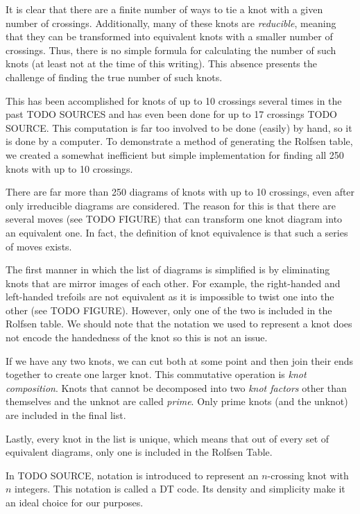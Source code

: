 \begin{paper}

It is clear that there are a finite number of ways to tie a knot with a given
number of crossings.
Additionally, many of these knots are \textit{reducible}, meaning that they can
be transformed into equivalent knots with a smaller number of crossings.
Thus, there is no simple formula for calculating the number of such knots (at
least not at the time of this writing).
This absence presents the challenge of finding the true number of such knots.

This has been accomplished for knots of up to 10 crossings several times in the
past TODO SOURCES and has even been done for up to 17 crossings TODO
SOURCE.
This computation is far too involved to be done (easily) by hand, so it is done
by a computer.
To demonstrate a method of generating the Rolfsen table, we created a somewhat
inefficient but simple implementation for finding all 250 knots with up to 10
crossings.

There are far more than 250 diagrams of knots with up to 10 crossings, even
after only irreducible diagrams are considered.
The reason for this is that there are several moves (see TODO FIGURE) that can
transform one knot diagram into an equivalent one.
In fact, the definition of knot equivalence is that such a series of moves
exists.

The first manner in which the list of diagrams is simplified is by eliminating
knots that are mirror images of each other.
For example, the right-handed and left-handed trefoils are not equivalent as it
is impossible to twist one into the other (see TODO FIGURE).
However, only one of the two is included in the Rolfsen table.
We should note that the notation we used to represent a knot does not
encode the handedness of the knot so this is not an issue.

If we have any two knots, we can cut both at some point and then join their ends
together to create one larger knot.
This commutative operation is \textit{knot composition}.
Knots that cannot be decomposed into two \textit{knot factors} other than
themselves and the unknot are called \textit{prime}.
Only prime knots (and the unknot) are included in the final list.

Lastly, every knot in the list is unique, which means that out of every set of
equivalent diagrams, only one is included in the Rolfsen Table.


In TODO SOURCE, notation is introduced to represent an $n$-crossing knot with
$n$ integers.
This notation is called a DT code.
Its density and simplicity make it an ideal choice for our purposes.


\end{paper}
